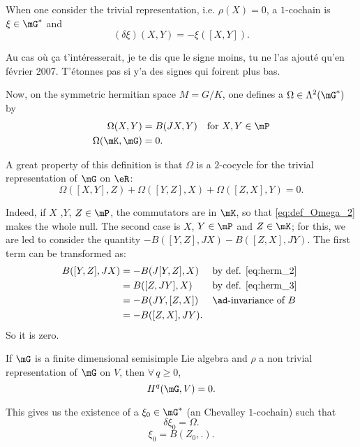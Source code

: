 When one consider the trivial representation, i.e. $\rho(X)=0$, a $1$-cochain is $\xi\in\mG^*$ and
\begin{equation}  \label{EqDefcochaintrivC}
(\delta\xi)(X,Y)=-\xi([X,Y]).
\end{equation}

\begin{probleme}
Au cas où ça t'intéresserait, je te dis que le signe moins, tu ne l'as ajouté qu'en février 2007. T'étonnes pas si y'a des signes qui foirent plus bas.
\end{probleme}

Now, on the symmetric hermitian space $M=G/K$, one defines a $\Omega\in\Lambda^2(\mG^*)$ by
\begin{subequations}
\begin{align}
   \Omega(X,Y)&=B(JX,Y)&\text{for $X,Y\in\mP$}  \label{eq:def_Omega_1}    \\
   \Omega(\mK,\mG)&=0.                          \label{eq:def_Omega_2} 
\end{align}
\end{subequations}   

A great property of this definition is that $\Omega$ is a $2$-cocycle for the trivial representation of $\mG$ on $\eR$:
\[
\Omega([X,Y],Z)+\Omega([Y,Z],X)+\Omega([Z,X],Y)=0.
\]

Indeed, if $X$ ,$Y$, $Z\in\mP$, the commutators are in $\mK$, so that \eqref{eq:def_Omega_2} makes the whole null. The second case is $X$, $Y\in\mP$ and $Z\in\mK$; for this, we are led to consider the quantity $-B( [Y,Z],JX )-B([Z,X],JY)$. The first term can be transformed as:
\[
\begin{aligned}
  B([Y,Z],JX)&=-B(J[Y,Z],X)&&\text{by def. \eqref{eq:herm_2} } \\
             &=B([Z,JY],X)&&\text{by def.  \eqref{eq:herm_3}}\\
	     &=-B(JY,[Z,X])&&\text{$\ad$-invariance of $B$}\\
	     &=-B([Z,X],JY).
\end{aligned}
\]
So it is zero.

\begin{lemma}
If $\mG$ is  a finite dimensional semisimple  Lie algebra and $\rho$ a non trivial representation of $\mG$ on $V$, then $\forall\,q\geq 0$,
\[
      H^q(\mG,V)=0.
\]
\end{lemma}

This gives us the existence of a $\xi_0\in\mG^*$ (an Chevalley $1$-cochain) such that 
\[
   \delta\xi_0=\Omega.
\]
\begin{equation}\label{eq:Z_0}
   \xi_0=B(Z_0,.).
\end{equation}

